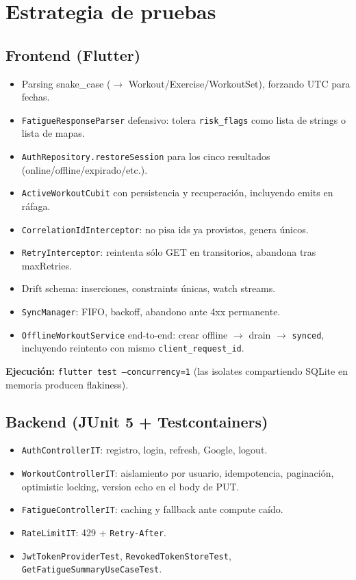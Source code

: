 \documentclass[11pt,a4paper]{article}
\newcommand{\cls}[1]{\texttt{\small #1}}
\begin{document}
\section{Estrategia de pruebas}

\subsection{Frontend (Flutter)}

\begin{itemize}[leftmargin=*]
  \item Parsing snake\_case ($\rightarrow$ Workout/Exercise/WorkoutSet), forzando UTC para fechas.
  \item \cls{FatigueResponseParser} defensivo: tolera \texttt{risk\_flags} como lista de strings o lista de mapas.
  \item \cls{AuthRepository.restoreSession} para los cinco resultados (online/offline/expirado/etc.).
  \item \cls{ActiveWorkoutCubit} con persistencia y recuperación, incluyendo emits en ráfaga.
  \item \cls{CorrelationIdInterceptor}: no pisa ids ya provistos, genera únicos.
  \item \cls{RetryInterceptor}: reintenta sólo GET en transitorios, abandona tras maxRetries.
  \item Drift schema: inserciones, constraints únicas, watch streams.
  \item \cls{SyncManager}: FIFO, backoff, abandono ante 4xx permanente.
  \item \cls{OfflineWorkoutService} end-to-end: crear offline $\rightarrow$ drain $\rightarrow$ \texttt{synced}, incluyendo reintento con mismo \texttt{client\_request\_id}.
\end{itemize}

\textbf{Ejecución:} \texttt{flutter test --concurrency=1} (las isolates compartiendo SQLite en memoria producen flakiness).

\subsection{Backend (JUnit 5 + Testcontainers)}

\begin{itemize}[leftmargin=*]
  \item \cls{AuthControllerIT}: registro, login, refresh, Google, logout.
  \item \cls{WorkoutControllerIT}: aislamiento por usuario, idempotencia, paginación, optimistic locking, version echo en el body de PUT.
  \item \cls{FatigueControllerIT}: caching y fallback ante compute caído.
  \item \cls{RateLimitIT}: 429 + \texttt{Retry-After}.
  \item \cls{JwtTokenProviderTest}, \cls{RevokedTokenStoreTest}, \cls{GetFatigueSummaryUseCaseTest}.
\end{itemize}
\end{document}
